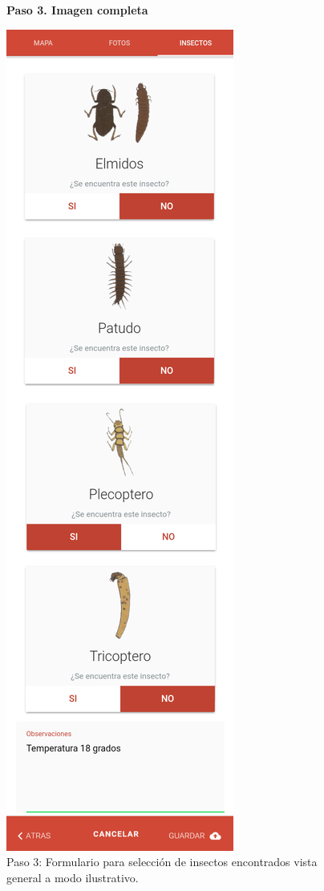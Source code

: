 				\begin{figure}[H]
					\centering
					\textbf{Paso 3. Imagen completa}\par\medskip
					\includegraphics[height=1.2\textwidth]{Screenshots/registroPaso3Completo.png}
					\caption{Paso 3: Formulario para selección de insectos encontrados vista general a modo ilustrativo.}
				\end{figure}
				
